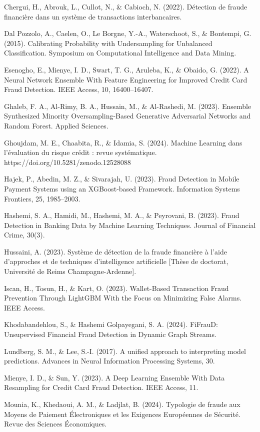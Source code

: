 Chergui, H., Abrouk, L., Cullot, N., \& Cabioch, N. (2022). Détection de fraude financière dans un système de transactions interbancaires.

Dal Pozzolo, A., Caelen, O., Le Borgne, Y.-A., Waterschoot, S., \& Bontempi, G. (2015). Calibrating Probability with Undersampling for Unbalanced Classification. Symposium on Computational Intelligence and Data Mining.

Esenogho, E., Mienye, I. D., Swart, T. G., Aruleba, K., \& Obaido, G. (2022). A Neural Network Ensemble With Feature Engineering for Improved Credit Card Fraud Detection. IEEE Access, 10, 16400–16407.

Ghaleb, F. A., Al-Rimy, B. A., Hussain, M., \& Al-Rashedi, M. (2023). Ensemble Synthesized Minority Oversampling-Based Generative Adversarial Networks and Random Forest. Applied Sciences.

Ghoujdam, M. E., Chaabita, R., \& Idamia, S. (2024). Machine Learning dans l'évaluation du risque crédit : revue systématique. https://doi.org/10.5281/zenodo.12528088

Hajek, P., Abedin, M. Z., \& Sivarajah, U. (2023). Fraud Detection in Mobile Payment Systems using an XGBoost-based Framework. Information Systems Frontiers, 25, 1985–2003.

Hashemi, S. A., Hamidi, M., Hashemi, M. A., \& Peyrovani, B. (2023). Fraud Detection in Banking Data by Machine Learning Techniques. Journal of Financial Crime, 30(3).

Hussaini, A. (2023). Système de détection de la fraude financière à l'aide d'approches et de techniques d'intelligence artificielle [Thèse de doctorat, Université de Reims Champagne-Ardenne].

Iscan, H., Tosun, H., \& Kart, O. (2023). Wallet-Based Transaction Fraud Prevention Through LightGBM With the Focus on Minimizing False Alarms. IEEE Access.

Khodabandehlou, S., \& Hashemi Golpayegani, S. A. (2024). FiFrauD: Unsupervised Financial Fraud Detection in Dynamic Graph Streams.

Lundberg, S. M., \& Lee, S.-I. (2017). A unified approach to interpreting model predictions. Advances in Neural Information Processing Systems, 30.

Mienye, I. D., \& Sun, Y. (2023). A Deep Learning Ensemble With Data Resampling for Credit Card Fraud Detection. IEEE Access, 11.

Mounia, K., Khedaoui, A. M., \& Ladjlat, B. (2024). Typologie de fraude aux Moyens de Paiement Électroniques et les Exigences Européennes de Sécurité. Revue des Sciences Économiques.

